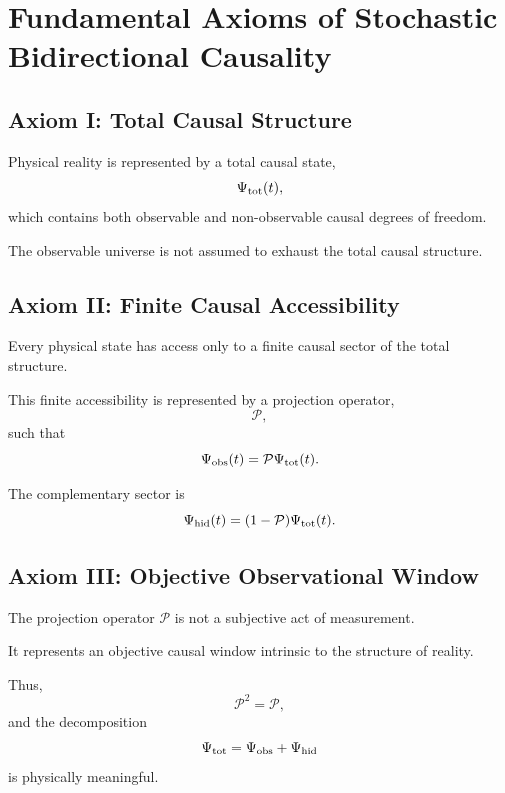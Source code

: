 \section{Fundamental Axioms of Stochastic Bidirectional Causality}

\subsection{Axiom I: Total Causal Structure}

Physical reality is represented by a total causal state,
\begin{equation}
\Psi_{\rm tot}(t),
\end{equation}
which contains both observable and non-observable causal degrees of freedom.

The observable universe is not assumed to exhaust the total causal structure.

\subsection{Axiom II: Finite Causal Accessibility}

Every physical state has access only to a finite causal sector of the total structure.

This finite accessibility is represented by a projection operator,
\begin{equation}
\mathcal P,
\end{equation}
such that
\begin{equation}
\Psi_{\rm obs}(t)
=
\mathcal P \Psi_{\rm tot}(t).
\end{equation}

The complementary sector is
\begin{equation}
\Psi_{\rm hid}(t)
=
(1-\mathcal P)\Psi_{\rm tot}(t).
\end{equation}

\subsection{Axiom III: Objective Observational Window}

The projection operator \(\mathcal P\) is not a subjective act of measurement.

It represents an objective causal window intrinsic to the structure of reality.

Thus,
\begin{equation}
\mathcal P^2=\mathcal P,
\end{equation}
and the decomposition
\begin{equation}
\Psi_{\rm tot}
=
\Psi_{\rm obs}
+
\Psi_{\rm hid}
\end{equation}
is physically meaningful.

